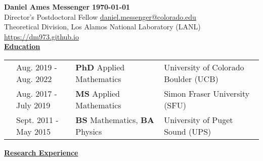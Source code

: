 \documentclass[letterpaper,11pt,oneside]{article}
\newcommand{\headr}[1]{\uline{\Large{\textbf{#1}} \hfill } \\ \vspace{-0.5cm}}
\begin{document}
%
\indent\vspace{0.2cm}\LARGE{\textbf{Daniel Ames Messenger} \hfill \textbf{\monthyeardate\today}} \\ %
\normalsize
%
%
\indent Director's Postdoctoral Fellow
\hfill \href{mailto:daniel.messenger@colorado.edu}{daniel.messenger@colorado.edu} \\
\indent Theoretical Division, Los Alamos National Laboratory (LANL) \hfill  \url{https://dm973.github.io} \\


\headr{Education}

\vspace{0.5cm}
\begin{tabular}{@{} p{0.01cm} @{} p{4.3cm} @{} p{5.7cm} @{} p{8cm}@{} }
& Aug. 2019 - Aug. 2022 & \textbf{PhD} Applied Mathematics & University of Colorado Boulder (UCB)\\ 
& Aug. 2017 - July 2019 & \textbf{MS} Applied Mathematics & Simon Fraser University (SFU)\\ 
& Sept. 2011 - May 2015  & \textbf{BS} Mathematics, \textbf{BA} Physics & University of Puget Sound (UPS)
\end{tabular}
\vspace{0.5cm}



\headr{Research Experience}
\end{document}
